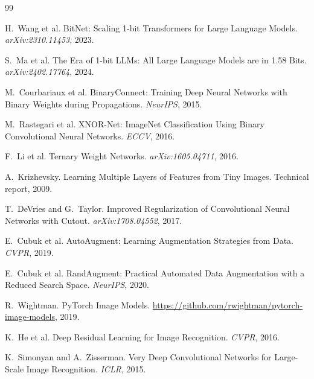 


\begin{thebibliography}{99}

H.~Wang et al.
\newblock BitNet: Scaling 1-bit Transformers for Large Language Models.
\newblock \emph{arXiv:2310.11453}, 2023.

S.~Ma et al.
\newblock The Era of 1-bit LLMs: All Large Language Models are in 1.58 Bits.
\newblock \emph{arXiv:2402.17764}, 2024.

M.~Courbariaux et al.
\newblock BinaryConnect: Training Deep Neural Networks with Binary Weights during Propagations.
\newblock \emph{NeurIPS}, 2015.

M.~Rastegari et al.
\newblock XNOR-Net: ImageNet Classification Using Binary Convolutional Neural Networks.
\newblock \emph{ECCV}, 2016.

F.~Li et al.
\newblock Ternary Weight Networks.
\newblock \emph{arXiv:1605.04711}, 2016.

A.~Krizhevsky.
\newblock Learning Multiple Layers of Features from Tiny Images.
\newblock Technical report, 2009.

T.~DeVries and G.~Taylor.
\newblock Improved Regularization of Convolutional Neural Networks with Cutout.
\newblock \emph{arXiv:1708.04552}, 2017.

E.~Cubuk et al.
\newblock AutoAugment: Learning Augmentation Strategies from Data.
\newblock \emph{CVPR}, 2019.

E.~Cubuk et al.
\newblock RandAugment: Practical Automated Data Augmentation with a Reduced Search Space.
\newblock \emph{NeurIPS}, 2020.

R.~Wightman.
\newblock PyTorch Image Models.
\newblock \url{https://github.com/rwightman/pytorch-image-models}, 2019.

K.~He et al.
\newblock Deep Residual Learning for Image Recognition.
\newblock \emph{CVPR}, 2016.

K.~Simonyan and A.~Zisserman.
\newblock Very Deep Convolutional Networks for Large-Scale Image Recognition.
\newblock \emph{ICLR}, 2015.


\end{thebibliography}
